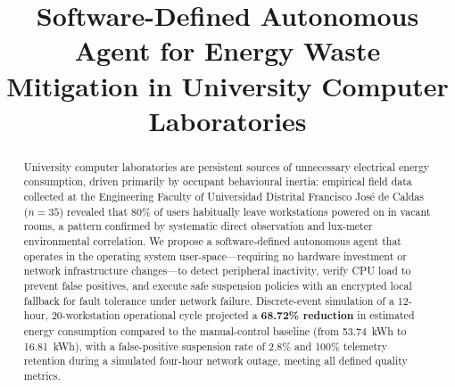 \documentclass[conference]{IEEEtran}
\begin{document}
\title{Software-Defined Autonomous Agent for Energy Waste\\
Mitigation in University Computer Laboratories}

\author{
  \and
  \and
  \and
}

\maketitle

\begin{abstract}
University computer laboratories are persistent sources of unnecessary electrical energy consumption, driven primarily by occupant behavioural inertia: empirical field data collected at the Engineering Faculty of Universidad Distrital Francisco José de Caldas ($n=35$) revealed that 80\% of users habitually leave workstations powered on in vacant rooms, a pattern confirmed by systematic direct observation and lux-meter environmental correlation. We propose a software-defined autonomous agent that operates in the operating system user-space—requiring no hardware investment or network infrastructure changes—to detect peripheral inactivity, verify CPU load to prevent false positives, and execute safe suspension policies with an encrypted local fallback for fault tolerance under network failure. Discrete-event simulation of a 12-hour, 20-workstation operational cycle projected a \textbf{68.72\% reduction} in estimated energy consumption compared to the manual-control baseline (from 53.74~kWh to 16.81~kWh), with a false-positive suspension rate of 2.8\% and 100\% telemetry retention during a simulated four-hour network outage, meeting all defined quality metrics.
\end{abstract}
\end{document}
